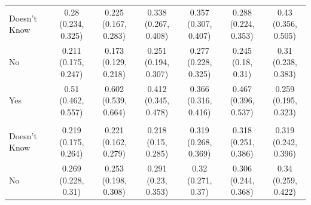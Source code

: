 \begin{tabular}[t]{lcccccc}
\hspace{1em}Doesn't Know & \makecell[c]{0.28\\(0.234, 0.325)} & \makecell[c]{0.225\\(0.167, 0.283)} & \makecell[c]{0.338\\(0.267, 0.408)} & \makecell[c]{0.357\\(0.307, 0.407)} & \makecell[c]{0.288\\(0.224, 0.353)} & \makecell[c]{0.43\\(0.356, 0.505)}\\
\hspace{1em}No & \makecell[c]{0.211\\(0.175, 0.247)} & \makecell[c]{0.173\\(0.129, 0.218)} & \makecell[c]{0.251\\(0.194, 0.307)} & \makecell[c]{0.277\\(0.228, 0.325)} & \makecell[c]{0.245\\(0.18, 0.31)} & \makecell[c]{0.31\\(0.238, 0.383)}\\
\hspace{1em}Yes & \makecell[c]{0.51\\(0.462, 0.557)} & \makecell[c]{0.602\\(0.539, 0.664)} & \makecell[c]{0.412\\(0.345, 0.478)} & \makecell[c]{0.366\\(0.316, 0.416)} & \makecell[c]{0.467\\(0.396, 0.537)} & \makecell[c]{0.259\\(0.195, 0.323)}\\
\addlinespace[0.3em]
\hline
\multicolumn{7}{l}{\textbf{Ink}}\\
\hline
\hspace{1em}Doesn't Know & \makecell[c]{0.219\\(0.175, 0.264)} & \makecell[c]{0.221\\(0.162, 0.279)} & \makecell[c]{0.218\\(0.15, 0.285)} & \makecell[c]{0.319\\(0.268, 0.369)} & \makecell[c]{0.318\\(0.251, 0.386)} & \makecell[c]{0.319\\(0.242, 0.396)}\\
\hspace{1em}No & \makecell[c]{0.269\\(0.228, 0.31)} & \makecell[c]{0.253\\(0.198, 0.308)} & \makecell[c]{0.291\\(0.23, 0.353)} & \makecell[c]{0.32\\(0.271, 0.37)} & \makecell[c]{0.306\\(0.244, 0.368)} & \makecell[c]{0.34\\(0.259, 0.422)}\\

\end{tabular}
